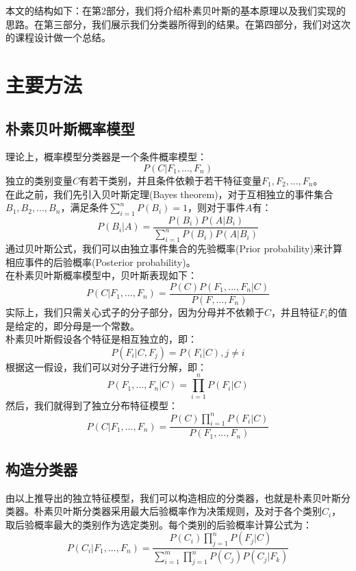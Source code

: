 \documentclass[a4paper, twocolumn, 12pt]{article}
\begin{document}
本文的结构如下：在第2部分，我们将介绍朴素贝叶斯的基本原理以及我们实现的思路。在第三部分，我们展示我们分类器所得到的结果。在第四部分，我们对这次的课程设计做一个总结。

\section{主要方法}
\subsection{朴素贝叶斯概率模型}
理论上，概率模型分类器是一个条件概率模型：
\[ P(C|F_1, ..., F_n) \]
独立的类别变量$C$有若干类别，并且条件依赖于若干特征变量$F_1, F_2, ..., F_n$。\\

在此之前，我们先引入贝叶斯定理(Bayes theorem)，对于互相独立的事件集合${B_1, B_2, ..., B_n}$，满足条件$\sum_{i=1}^n P(B_i)=1$，则对于事件$A$有：
\[P(B_i|A)=\frac{P(B_i)P(A|B_i)}{\sum_{i=1}^n P(B_i)P(A|B_i)}\]
通过贝叶斯公式，我们可以由独立事件集合的先验概率(Prior probability)来计算相应事件的后验概率(Posterior probability)。\\

在朴素贝叶斯概率模型中，贝叶斯表现如下：
\[P(C|F_1, ..., F_n)=\frac{P(C)P(F_1, ..., F_n|C)}{P(F, ..., F_n)}\]
实际上，我们只需关心式子的分子部分，因为分母并不依赖于$C$，并且特征$F_i$的值是给定的，即分母是一个常数。\\

朴素贝叶斯假设各个特征是相互独立的，即：
\[P(F_i|C, F_j)=P(F_i|C), j \neq i\]
根据这一假设，我们可以对分子进行分解，即：
\[P(F_1, ..., F_n|C)=\prod_{i=1}^nP(F_i|C)\]
然后，我们就得到了独立分布特征模型：
\[P(C|F_1, ..., F_n)=\frac{P(C)\prod_{i=1}^n P(F_i|C)}{P(F_1, ..., F_n)}\]
\subsection{构造分类器}
由以上推导出的独立特征模型，我们可以构造相应的分类器，也就是朴素贝叶斯分类器。朴素贝叶斯分类器采用最大后验概率作为决策规则，及对于各个类别$C_i$，取后验概率最大的类别作为选定类别。每个类别的后验概率计算公式为：
\[P(C_i|F_1, ..., F_n)=\frac{P(C_i)\prod_{j=1}^nP(F_j|C)}{\sum_{i=1}^m \prod_{j=1}^nP(C_j)P(C_j|F_k)}\]
\end{document}
